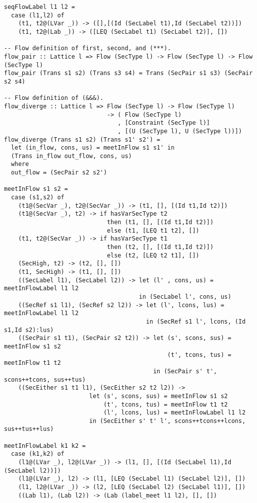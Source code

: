 \begin{Verbatim}[fontsize=\footnotesize,frame=lines,
                 framesep=5mm, label={[FlowArrowRef.hs]FlowArrowRef.hs}]
seqFlowLabel l1 l2 =
  case (l1,l2) of
    (t1, t2@(LVar _)) -> ([],[(Id (SecLabel t1),Id (SecLabel t2))])
    (t1, t2@(Lab _)) -> ([LEQ (SecLabel t1) (SecLabel t2)], [])

-- Flow definition of first, second, and (***). 
flow_pair :: Lattice l => Flow (SecType l) -> Flow (SecType l) -> Flow (SecType l)
flow_pair (Trans s1 s2) (Trans s3 s4) = Trans (SecPair s1 s3) (SecPair s2 s4) 

-- Flow definition of (&&&). 
flow_diverge :: Lattice l => Flow (SecType l) -> Flow (SecType l) 
                             -> ( Flow (SecType l)
                                , [Constraint (SecType l)]
                                , [(U (SecType l), U (SecType l))])
flow_diverge (Trans s1 s2) (Trans s1' s2') =
  let (in_flow, cons, us) = meetInFlow s1 s1' in
  (Trans in_flow out_flow, cons, us)
  where
  out_flow = (SecPair s2 s2')

meetInFlow s1 s2 =
  case (s1,s2) of
    (t1@(SecVar _), t2@(SecVar _)) -> (t1, [], [(Id t1,Id t2)])
    (t1@(SecVar _), t2) -> if hasVarSecType t2
                             then (t1, [], [(Id t1,Id t2)])
                             else (t1, [LEQ t1 t2], [])
    (t1, t2@(SecVar _)) -> if hasVarSecType t1
                             then (t2, [], [(Id t1,Id t2)])
                             else (t2, [LEQ t2 t1], [])
    (SecHigh, t2) -> (t2, [], [])
    (t1, SecHigh) -> (t1, [], [])
    ((SecLabel l1), (SecLabel l2)) -> let (l' , cons, us) = meetInFlowLabel l1 l2 
                                      in (SecLabel l', cons, us)
    ((SecRef s1 l1), (SecRef s2 l2)) -> let (l', lcons, lus) = meetInFlowLabel l1 l2 
                                        in (SecRef s1 l', lcons, (Id s1,Id s2):lus)
    ((SecPair s1 t1), (SecPair s2 t2)) -> let (s', scons, sus) = meetInFlow s1 s2 
                                              (t', tcons, tus) = meetInFlow t1 t2 
                                          in (SecPair s' t', scons++tcons, sus++tus)
    ((SecEither s1 t1 l1), (SecEither s2 t2 l2)) -> 
                        let (s', scons, sus) = meetInFlow s1 s2
                            (t', tcons, tus) = meetInFlow t1 t2
                            (l', lcons, lus) = meetInFlowLabel l1 l2
                        in (SecEither s' t' l', scons++tcons++lcons, sus++tus++lus)

meetInFlowLabel k1 k2 =
  case (k1,k2) of
    (l1@(LVar _), l2@(LVar _)) -> (l1, [], [(Id (SecLabel l1),Id (SecLabel l2))])
    (l1@(LVar _), l2) -> (l1, [LEQ (SecLabel l1) (SecLabel l2)], [])
    (l1, l2@(LVar _)) -> (l2, [LEQ (SecLabel l2) (SecLabel l1)], [])
    ((Lab l1), (Lab l2)) -> (Lab (label_meet l1 l2), [], [])


\end{Verbatim}
